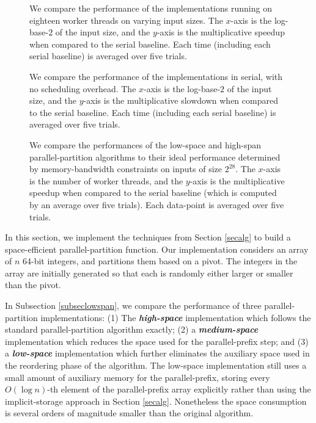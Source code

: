 \documentclass[sigconf]{acmart}
\newcommand{\defn}[1]       {{\textit{\textbf{\boldmath #1}}}}
\theoremstyle{remark}
\theoremstyle{remark}
\begin{document}
\begin{figure*}
  \begin{center}
    \cilktwotabletwo
  \end{center}
  \caption{We compare the performance of the implementations running
    on eighteen worker threads on varying input sizes. The $x$-axis is
    the log-base-$2$ of the input size, and the $y$-axis is the
    multiplicative speedup when compared to the serial baseline. Each
    time (including each serial baseline) is averaged over five
    trials.}
  \label{tablecilk2}
\end{figure*}


\begin{figure*}
  \begin{center}
    \serialtable
  \end{center}
  \caption{We compare the performance of the implementations in
    serial, with no scheduling overhead. The $x$-axis is the
    log-base-$2$ of the input size, and the $y$-axis is the
    multiplicative slowdown when compared to the serial baseline. Each
    time (including each serial baseline) is averaged over five
    trials.}
  \label{tableserial}
\end{figure*}

\begin{figure*}
  \begin{center}
    \partitionbandwidthboundtable
  \end{center}
  \caption{We compare the performances of the low-space and high-span
    parallel-partition algorithms to their ideal performance
    determined by memory-bandwidth constraints on inputs of size
    $2^{28}$. The $x$-axis is the number of worker threads, and the
    $y$-axis is the multiplicative speedup when compared to the serial
    baseline (which is computed by an average over five trials). Each
    data-point is averaged over five trials.}
  \label{tablebandwidth}
\end{figure*}


In this section, we implement the techniques from Section \ref{secalg}
to build a space-efficient parallel-partition function. Our
implementation considers an array of $n$ 64-bit integers, and
partitions them based on a pivot. The integers in the array are
initially generated so that each is randomly either larger or smaller
than the pivot.

In Subsection \ref{subseclowspan}, we compare the performance of three
parallel-partition implementations: (1) The \defn{high-space}
implementation which follows the standard parallel-partition algorithm
exactly; (2) a \defn{medium-space} implementation which reduces the
space used for the parallel-prefix step; and (3) a \defn{low-space}
implementation which further eliminates the auxiliary space used in the
reordering phase of the algorithm. The low-space implementation still
uses a small amount of auxiliary memory for the parallel-prefix,
storing every $O(\log n)$-th element of the parallel-prefix array
explicitly rather than using the implicit-storage approach in Section
\ref{secalg}. Nonetheless the space consumption is several orders of
magnitude smaller than the original algorithm.
\end{document}
